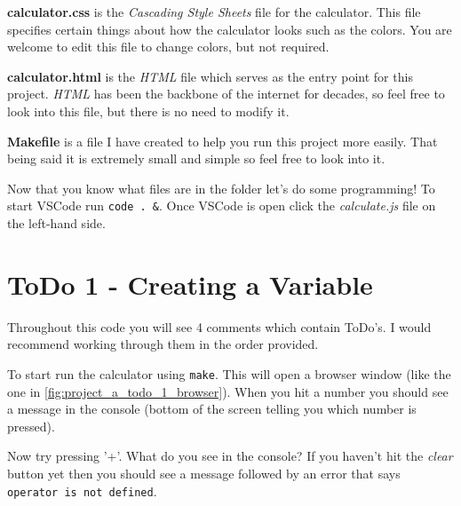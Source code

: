     \textbf{calculator.css} is the \textit{Cascading Style Sheets} file for the calculator.
    This file specifies certain things about how the calculator looks such as the colors.
    You are welcome to edit this file to change colors, but not required.

    \textbf{calculator.html} is the \textit{HTML} file which serves as the entry point for this project.
    \textit{HTML} has been the backbone of the internet for decades, so feel free to look into this file, but there is no need to modify it.

    \textbf{Makefile} is a file I have created to help you run this project more easily.
    That being said it is extremely small and simple so feel free to look into it.

    Now that you know what files are in the folder let's do some programming!
    To start VSCode run \texttt{code . \&}.
    Once VSCode is open click the \textit{calculate.js} file on the left-hand side.

  \section{ToDo 1 - Creating a Variable}
  \label{sec:project_a_todo_1}

    Throughout this code you will see 4 comments which contain ToDo's.
    I would recommend working through them in the order provided.

    To start run the calculator using \texttt{make}.
    This will open a browser window (like the one in \autoref{fig:project_a_todo_1_browser}).
    When you hit a number you should see a message in the console (bottom of the screen telling you which number is pressed).
    
    Now try pressing '+'.
    What do you see in the console?
    If you haven't hit the \textit{clear} button yet then you should see a message followed by an error that says
      \texttt{operator is not defined}.
    
